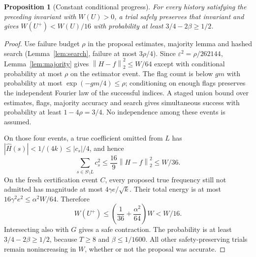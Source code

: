 \documentclass[11pt]{article}
\newtheorem{proposition}[theorem]{Proposition}
\theoremstyle{remark}\newtheorem{remark}[theorem]{Remark}
\newcommand{\norm}[1]{\left\|#1\right\|}
\begin{document}
\begin{proposition}[Constant conditional progress]\label{prop:contraction}
For every history satisfying the preceding invariant with $W(U)>0$, a trial safely preserves that invariant and gives $W(U^+)<W(U)/16$ with probability at least $3/4-2\beta\ge1/2$.
\end{proposition}
\begin{proof}
Use failure budget $\rho$ in the proposal estimates, majority lemma and hashed search (Lemma~\ref{lem:search}, failure at most $3\rho/4$). Since $\varepsilon^2=\rho/262144$, Lemma~\ref{lem:majority} gives $\norm{H-f}_2^2\le W/64$ except with conditional probability at most $\rho$ on the estimator event. The flag count is below $gm$ with probability at most $\exp(-gm/4)\le\rho$; conditioning on enough flags preserves the independent Fourier law of the successful indices. A staged union bound over estimates, flags, majority accuracy and search gives simultaneous success with probability at least $1-4\rho=3/4$. No independence among these events is assumed.

On those four events, a true coefficient omitted from $L$ has $|\widehat H(s)|<1/(4k)\le|c_s|/4$, and hence
\begin{equation}\label{eq:omitted}
 \sum_{s\in S\setminus L}c_s^2
 \le\frac{16}{9}\norm{H-f}_2^2\le W/36.
\end{equation}
On the fresh certification event $C$, every proposed true frequency still not admitted has magnitude at most $4\gamma e/\sqrt k$. Their total energy is at most $16\gamma^2e^2\le\alpha^2W/64$. Therefore
\begin{equation}\label{eq:contract}
 W(U^+)\le\left(\frac1{36}+\frac{\alpha^2}{64}\right)W<W/16.
\end{equation}
Intersecting also with $G$ gives a safe contraction. The probability is at least $3/4-2\beta\ge1/2$, because $T\ge8$ and $\beta\le1/1600$. All other safety-preserving trials remain nonincreasing in $W$, whether or not the proposal was accurate.
\end{proof}
\end{document}

